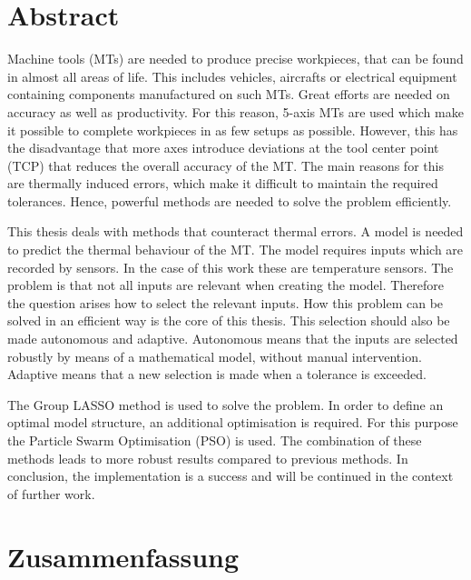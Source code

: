 \chapter*{Abstract}

Machine tools (MTs) are needed to produce precise workpieces, that can be found in almost all areas of life. This includes vehicles, aircrafts or electrical equipment containing components manufactured on such MTs. Great efforts are needed on accuracy as well as productivity. For this reason, 5-axis MTs are used which make it possible to complete workpieces in as few setups as possible. However, this has the disadvantage that more axes introduce deviations at the tool center point (TCP) that reduces the overall accuracy of the MT. The main reasons for this are thermally induced errors, which make it difficult to maintain the required tolerances. Hence, powerful methods are needed to solve the problem efficiently.

This thesis deals with methods that counteract thermal errors. A model is needed to predict the thermal behaviour of the MT. The model requires inputs which are recorded by sensors. In the case of this work these are temperature sensors. The problem is that not all inputs are relevant when creating the model. Therefore the question arises how to select the relevant inputs. How this problem can be solved in an efficient way is the core of this thesis. This selection should also be made autonomous and adaptive. Autonomous means that the inputs are selected robustly by means of a mathematical model, without manual intervention. Adaptive means that a new selection is made when a tolerance is exceeded.


The Group LASSO method is used to solve the problem. In order to define an optimal model structure, an additional optimisation is required. For this purpose the Particle Swarm Optimisation (PSO) is used. The combination of these methods leads to more robust results compared to previous methods.  In conclusion, the implementation is a success and will be continued in the context of further work.


\cleardoublepage
\chapter*{Zusammenfassung}


